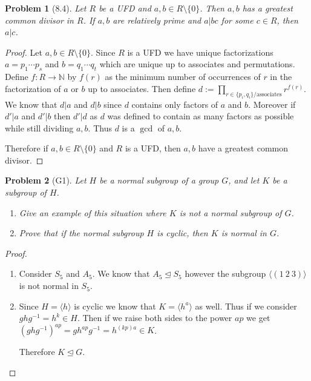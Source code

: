 \documentclass[10pt]{article}
\newcommand{\sk}{\vskip 10mm}
\newcommand{\bb}[1]{\mathbb{#1}}
\theoremstyle{plain}
\newtheorem{problem}{Problem}
\theoremstyle{remark}
\begin{document}
\sk

\begin{problem}[8.4]
  Let $R$ be a UFD and $a,b\in R\setminus\{0\}$. Then $a,b$ has a greatest
  common divisor in $R$. If $a,b$ are relatively prime and $a|bc$ for some
  $c\in R$, then $a|c$.
\end{problem}

\begin{proof}
  Let $a,b\in R\setminus\{0\}$. Since $R$ is a UFD we have unique factorizations
  $a=p_1\cdots p_s$ and $b=q_1\cdots q_t$ which are unique up to associates and permutations.
  Define $f:R\rightarrow \bb{N}$ by $f(r)$ as the minimum number of occurrences of
  $r$ in the factorization of $a$ or $b$ up to associates. Then
  define $d:=\prod_{r\in\{p_i,q_i\}/\text{associates}}r^{f(r)}$. We know that $d|a$ and $d|b$
  since $d$ contains only factors of $a$ and $b$. Moreover if $d'|a$ and $d'|b$
  then $d'|d$ as $d$ was defined to contain as many factors as possible while
  still dividing $a,b$. Thus $d$ is a $\gcd$ of $a,b$.

  Therefore if $a,b\in R\setminus\{0\}$ and $R$ is a UFD, then $a,b$ have a greatest common
  divisor.
\end{proof}

\sk

\begin{problem}[G1]
  Let $H$ be a normal subgroup of a group $G$, and let $K$ be a subgroup of $H$.
  \begin{enumerate}
  \item Give an example of this situation where $K$ is not a normal
    subgroup of $G$.
  \item Prove that if the normal subgroup $H$ is cyclic, then $K$ is normal
    in $G$.
  \end{enumerate}
\end{problem}

\begin{proof}
  \begin{enumerate}
  \item Consider $S_5$ and $A_5$. We know that $A_5\trianglelefteq S_5$ however
    the subgroup $\langle(1\ 2\ 3)\rangle$ is not normal in $S_5$.
  \item Since $H=\langle h\rangle$ is cyclic we know that $K=\langle h^a\rangle$ as well. Thus
    if we consider $ghg^{-1}=h^k\in H$. Then if we raise both sides to the
    power $ap$ we get $(ghg^{-1})^{ap}=gh^{ap}g^{-1}=h^{(kp)a}\in K$.

    Therefore $K\trianglelefteq G$.
  \end{enumerate}
\end{proof}
\end{document}

